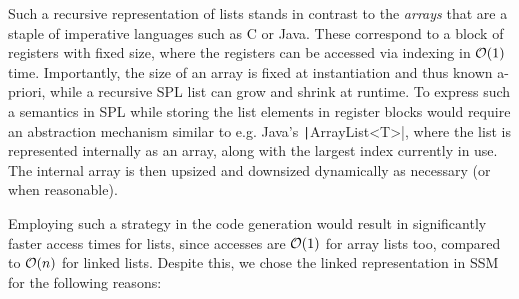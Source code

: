 Such a recursive representation of lists stands in contrast to the \emph{arrays}
that are a staple of imperative languages such as C or Java. These correspond
to a block of registers with fixed size, where the registers can be
accessed via indexing in $\mathcal{O}(1)$ time.
Importantly, the size of an array is fixed at instantiation and thus known
a-priori, while a recursive SPL list can grow and shrink at runtime. To express
such a semantics in SPL while storing the list elements in register blocks would
require an abstraction mechanism similar to e.g. Java's
\texttt|ArrayList<T>|, where the list is represented internally as an
array, along with the largest index currently in use. The internal array is then
upsized and downsized dynamically as necessary (or when reasonable).

Employing such a strategy in the code generation would result in significantly
faster access times for lists, since accesses are $\mathcal{O}(1)$ for array lists
too, compared to $\mathcal{O}(n)$ for linked lists.
Despite this, we chose the linked representation in SSM for the following reasons:
%
